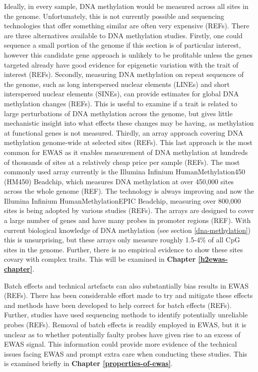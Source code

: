 \documentclass[11pt,twoside]{bristolthesis}
\begin{document}
Ideally, in every sample, DNA methylation would be measured across all sites in the genome. Unfortunately, this is not currently possible and sequencing technologies that offer something similar are often very expensive (REFs). There are three alternatives available to DNA methylation studies. Firstly, one could sequence a small portion of the genome if this section is of particular interest, however this candidate gene approach is unlikely to be profitable unless the genes targeted already have good evidence for epigenetic variation with the trait of interest (REFs). Secondly, measuring DNA methylation on repeat sequences of the genome, such as long interspersed nuclear elements (LINEs) and short interspersed nuclear elements (SINEs), can provide estimates for global DNA methylation changes (REFs). This is useful to examine if a trait is related to large perturbations of DNA methylation across the genome, but gives little mechanistic insight into what effects these changes may be having, as methylation at functional genes is not measured. Thirdly, an array approach covering DNA methylation genome-wide at selected sites (REFs). This last approach is the most common for EWAS as it enables measurement of DNA methylation at hundreds of thousands of sites at a relatively cheap price per sample (REFs). The most commonly used array currently is the Illumina Infinium HumanMethylation450 (HM450) Beadchip, which measures DNA methylation at over 450,000 sites across the whole genome (REF). The technology is always improving and now the Illumina Infinium HumanMethylationEPIC Beadchip, measuring over 800,000 sites is being adopted by various studies (REFs). The arrays are designed to cover a large number of genes and have many probes in promoter regions (REF). With current biological knowledge of DNA methylation (see section \ref{dna-methylation}) this is unsurprising, but these arrays only measure roughly 1.5-4\% of all CpG sites in the genome. Further, there is no empirical evidence to show these sites covary with complex traits. This will be examined in \textbf{Chapter \ref{h2ewas-chapter}}.

Batch effects and technical artefacts can also substantially bias results in EWAS (REFs). There has been considerable effort made to try and mitigate these effects and methods have been developed to help correct for batch effects (REFs). Further, studies have used sequencing methods to identify potentially unreliable probes (REFs). Removal of batch effects is readily employed in EWAS, but it is unclear as to whether potentially faulty probes have given rise to an excess of EWAS signal. This information could provide more evidence of the technical issues facing EWAS and prompt extra care when conducting these studies. This is examined briefly in \textbf{Chapter \ref{properties-of-ewas}}.
\end{document}
